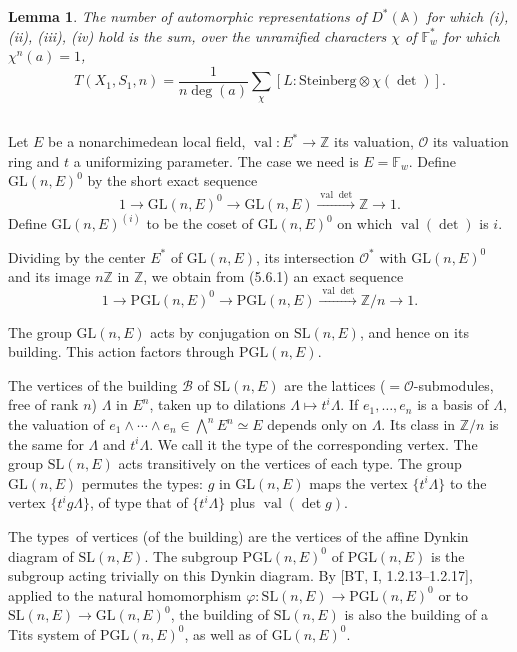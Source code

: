 \documentclass[11pt,a4paper]{article}
\theoremstyle{plain}
\newtheorem{lemma}[theorem]{Lemma}
\theoremstyle{definition}
\DeclareMathOperator{\val}{val}
\newcommand{\Z}{\mathbb{Z}}
\newcommand{\GL}{\mathrm{GL}}
\newcommand{\PGL}{\mathrm{PGL}}
\newcommand{\SL}{\mathrm{SL}}
\newcommand{\vp}{\varphi}
\begin{document}
\begin{lemma}
The number of automorphic representations of $D^*(\mathbb{A})$ for which (i), (ii), (iii), (iv) hold is the sum, over the unramified characters $\chi$ of $\mathbb{F}_w^*$ for which $\chi^n(a) = 1$,
\begin{equation}
T(X_1, S_1, n) = \frac{1}{n\deg(a)} \sum_\chi [L : \text{Steinberg} \otimes \chi(\det)]. \tag{5.5.1}
\end{equation}
\end{lemma}

\subsection{}
Let $E$ be a nonarchimedean local field, $\val: E^* \to \Z$ its valuation, $\mathcal{O}$ its valuation ring and $t$ a uniformizing parameter. The case we need is $E = \mathbb{F}_w$. Define $\GL(n,E)^0$ by the short exact sequence
\begin{equation}
1 \to \GL(n,E)^0 \to \GL(n,E) \xrightarrow{\val \det} \Z \to 1. \tag{5.6.1}
\end{equation}
Define $\GL(n,E)^{(i)}$ to be the coset of $\GL(n,E)^0$ on which $\val(\det)$ is $i$.

Dividing by the center $E^*$ of $\GL(n,E)$, its intersection $\mathcal{O}^*$ with $\GL(n,E)^0$ and its image $n\Z$ in $\Z$, we obtain from (5.6.1) an exact sequence
\begin{equation}
1 \to \PGL(n,E)^0 \to \PGL(n,E) \xrightarrow{\val \det} \Z/n \to 1. \tag{5.6.2}
\end{equation}

The group $\GL(n,E)$ acts by conjugation on $\SL(n,E)$, and hence on its building. This action factors through $\PGL(n,E)$.

The vertices of the building $\mathcal{B}$ of $\SL(n,E)$ are the lattices ($= \mathcal{O}$-submodules, free of rank $n$) $\Lambda$ in $E^n$, taken up to dilations $\Lambda \mapsto t^i \Lambda$. If $e_1, \ldots, e_n$ is a basis of $\Lambda$, the valuation of $e_1 \wedge \cdots \wedge e_n \in \bigwedge^n E^n \simeq E$ depends only on $\Lambda$. Its class in $\Z/n$ is the same for $\Lambda$ and $t^i \Lambda$. We call it the type of the corresponding vertex. The group $\SL(n,E)$ acts transitively on the vertices of each type. The group $\GL(n,E)$ permutes the types: $g$ in $\GL(n,E)$ maps the vertex $\{t^i \Lambda\}$ to the vertex $\{t^i g \Lambda\}$, of type that of $\{t^i \Lambda\}$ plus $\val(\det g)$.

The types\ of vertices (of the building) are the vertices of the affine Dynkin diagram of $\SL(n,E)$. The subgroup $\PGL(n,E)^0$ of $\PGL(n,E)$ is the subgroup acting trivially on this Dynkin diagram. By [BT, I, 1.2.13--1.2.17], applied to the natural homomorphism $\vp: \SL(n,E) \to \PGL(n,E)^0$ or to $\SL(n,E) \to \GL(n,E)^0$, the building of $\SL(n,E)$ is also the building of a Tits system of $\PGL(n,E)^0$, as well as of $\GL(n,E)^0$.
\end{document}
